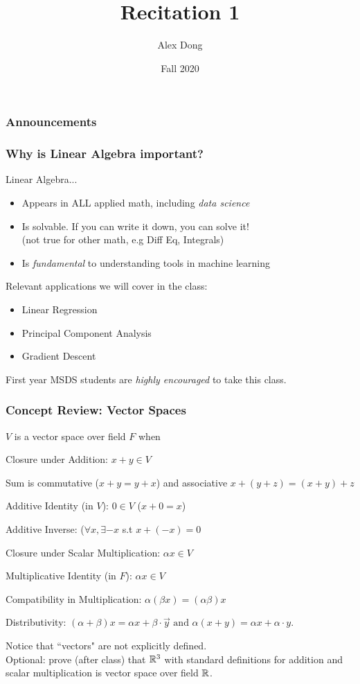 \documentclass{beamer}
\title{Recitation 1 }
\author{Alex Dong}
\institute{CDS, NYU}
\date{Fall 2020}
\newcommand\Fonteight{\fontsize{8}{9.6}\selectfont}
\renewenvironment{enumerate}%
{\begin{list}{\arabic{enumi}.}%
      {\setlength{\leftmargin}{2.5em}%
       \setlength{\itemsep}{-\parsep}%
       \setlength{\topsep}{-\parskip}%
       \usecounter{enumi}}%
 }{\end{list}}
\begin{document}
\frame{\titlepage} 
\begin{frame}
\frametitle{Announcements}
\end{frame}

\begin{frame}
\frametitle{Why is Linear Algebra important?}
Linear Algebra...
\begin{itemize}
\item Appears in ALL applied math, including \textit{data science}
\item Is solvable. If you can write it down, you can solve it! \\
    \qquad (not true for other math, e.g Diff Eq, Integrals)
\item Is \textit{fundamental} to understanding tools in machine learning
\end{itemize}

Relevant applications we will cover in the class:
\begin{itemize}
\item Linear Regression
\item Principal Component Analysis
\item Gradient Descent
\end{itemize}

First year MSDS students are \textit{highly encouraged} to take this class.
\end{frame}
\begin{frame}
\frametitle{Concept Review: Vector Spaces}

\begin{definition}
	    $V$ is a vector space over field $F$ when
	    \Fonteight
		\begin{enumerate}
		\item[1.] Closure under Addition: $x+y \in V$
		\item[2.] Sum is commutative ($x+y = y+x$) and associative $x+(y+z)= (x+y)+z$
		\item[3.] Additive Identity (in $V$): $0\in V$ ($x+0 =x$)
		\item[4.] Additive Inverse: ($\forall x, \exists -x $ s.t $ x+(-x)=0$
		\item[5.] Closure under Scalar Multiplication: $\alpha x \in V$
		\item[6.] Multiplicative Identity (in $F$): $\alpha x \in V$
		\item[7.] Compatibility in Multiplication: $\alpha (\beta x) = (\alpha \beta) x $
		\item[8.] Distributivity: $(\alpha + \beta) x = \alpha x + \beta \cdot \vec{y}
			 \text{ and }
			\alpha  (x + y) = \alpha  x + \alpha \cdot y.$
		\end{enumerate}
\end{definition}
Notice that ``vectors" are not explicitly defined. \\
Optional: prove (after class) that $\mathbb{R}^3$ with standard definitions for addition and scalar multiplication
 is vector space over field $\mathbb{R}$.
\end{frame}
\end{document}

